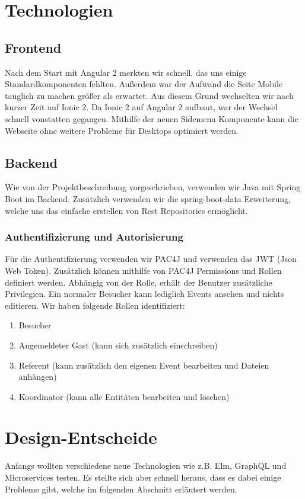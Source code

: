 \documentclass[11pt]{article} %
\begin{document}
\newpage
\section{Technologien}

\subsection{Frontend}
Nach dem Start mit Angular 2 merkten wir schnell, das uns einige Standardkomponenten fehlten. Außerdem war der Aufwand die Seite Mobile tauglich zu machen größer als erwartet. Aus diesem Grund wechselten wir nach kurzer Zeit auf Ionic 2. Da Ionic 2 auf Angular 2 aufbaut, war der Wechsel schnell vonstatten gegangen. Mithilfe der neuen Sidemenu Komponente kann die Webseite ohne weitere Probleme für Desktops optimiert werden.

\subsection{Backend}
Wie von der Projektbeschreibung vorgeschrieben, verwenden wir Java mit Spring Boot im Backend. Zusätzlich verwenden wir die spring-boot-data Erweiterung, welche uns das einfache erstellen von Rest Repositories ermöglicht. 

\subsubsection{Authentifizierung und Autorisierung}
Für die Authentifizierung verwenden wir PAC4J und verwenden das JWT (Json Web Token). Zusätzlich können mithilfe von PAC4J Permissions und Rollen definiert werden. Abhängig von der Rolle, erhält der Benutzer zusätzliche Privilegien. Ein normaler Besucher kann lediglich Events ansehen und nichts editieren. Wir haben folgende Rollen identifiziert:

\begin{enumerate}
\item Besucher
\item Angemeldeter Gast (kann sich zusätzlich einschreiben)
\item Referent (kann zusätzlich den eigenen Event bearbeiten und Dateien anhängen)
\item Koordinator (kann alle Entitäten bearbeiten und löschen)
\end{enumerate}

\newpage
\section{Design-Entscheide}
Anfangs wollten verschiedene neue Technologien wie z.B. Elm, GraphQL und Microservices testen. Es stellte sich aber schnell heraus, dass es dabei einige Probleme gibt, welche im folgenden Abschnitt erläutert werden.
\end{document}
